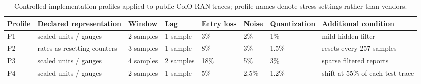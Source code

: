 
\begin{table}[t]
\caption{Controlled implementation profiles applied to public ColO-RAN traces; profile names denote stress settings rather than vendors.}
\label{tab:profiles}
\centering
\scriptsize
\setlength{\tabcolsep}{4.2pt}
\begin{tabular}{llllllll}
\toprule
Profile & Declared representation & Window & Lag & Entry loss & Noise & Quantization & Additional condition \\
\midrule
P1 & scaled units / gauges & 2 samples & 1 sample & 3\% & 2\% & 1\% & mild hidden filter \\
P2 & rates as resetting counters & 3 samples & 1 sample & 8\% & 3\% & 1.5\% & resets every 257 samples \\
P3 & scaled units / gauges & 4 samples & 2 samples & 18\% & 5\% & 3\% & sparse filtered reports \\
P4 & scaled units / gauges & 2 samples & 1 sample & 5\% & 2.5\% & 1.2\% & shift at 55\% of each test trace \\
\bottomrule
\end{tabular}
\end{table}
